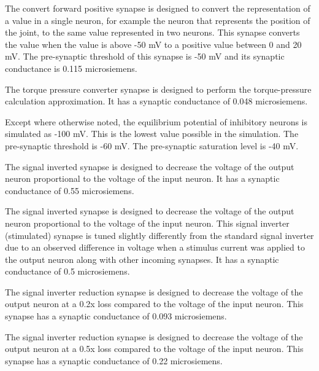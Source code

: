 
The convert forward positive synapse is designed to convert the representation
of a value in a single neuron, for example the neuron that represents the 
position of the joint, to the same value represented in two neurons. This
synapse converts the value when the value is above -50 mV to a positive value between 0 
and 20 mV. The pre-synaptic
threshold of this synapse is -50 mV and its synaptic conductance is 0.115 microsiemens.


The torque pressure converter synapse is designed to perform the torque-pressure
calculation approximation. It has a synaptic 
conductance of 0.048 microsiemens.


Except where otherwise noted, the equilibrium potential of inhibitory neurons
is simulated as -100 mV. This is the lowest value possible in the simulation.
The pre-synaptic threshold is -60 mV. The pre-synaptic saturation level is -40
mV.


The signal inverted synapse is designed to decrease the voltage of the output 
neuron proportional to the voltage of the input neuron. It has a synaptic 
conductance of 0.55 microsiemens.


The signal inverted synapse is designed to decrease the voltage of the output 
neuron proportional to the voltage of the input neuron. This signal inverter (stimulated) synapse is tuned
slightly differently from the standard signal inverter due to an
observed difference in voltage when a stimulus current was applied to the output
neuron along with other incoming synapses. It has a synaptic 
conductance of 0.5 microsiemens.


The signal inverter reduction synapse is designed to decrease the voltage of
the output 
neuron at a 0.2x loss compared to the voltage of the input neuron. This synapse has a 
synaptic conductance of 0.093 microsiemens.


The signal inverter reduction synapse is designed to decrease the voltage of
the output 
neuron at a 0.5x loss compared to the voltage of the input neuron. This synapse has a 
synaptic conductance of 0.22 microsiemens.

